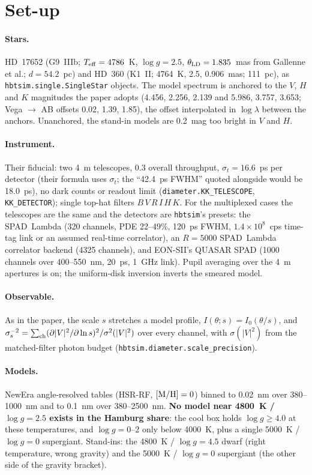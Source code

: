 \documentclass[11pt]{article}
\begin{document}
\section{Set-up}

\paragraph{Stars.} HD~17652 (G9~IIIb; $T_{\rm eff} = 4786$~K, $\log g
= 2.5$, $\theta_{\rm LD} = 1.835$~mas from Gallenne et al.; $d =
54.2$~pc) and HD~360 (K1~II; 4764~K, 2.5, 0.906~mas; 111~pc), as
\texttt{hbtsim.single.SingleStar} objects. The model spectrum is
anchored to the $V$, $H$ and $K$ magnitudes the paper adopts (4.456,
2.256, 2.139 and 5.986, 3.757, 3.653; Vega $\to$ AB offsets 0.02,
1.39, 1.85), the offset interpolated in $\log\lambda$ between the
anchors. Unanchored, the stand-in models are 0.2~mag too bright in
$V$ and $H$.

\paragraph{Instrument.} Their fiducial: two 4~m telescopes, 0.3
overall throughput, $\sigma_t = 16.6$~ps per detector (their formula
uses $\sigma_t$; the ``42.4~ps FWHM'' quoted alongside would be
18.0~ps), no dark counts or readout limit
(\texttt{diameter.KK\_TELESCOPE}, \texttt{KK\_DETECTOR}); single
top-hat filters $B\,V\,R\,I\,H\,K$. For the multiplexed cases the
telescopes are the same and the detectors are \texttt{hbtsim}'s
presets: the SPAD~Lambda (320 channels, PDE 22--49\%, 120~ps FWHM,
$1.4\times10^8$~cps time-tag link or an assumed real-time correlator), an $R =
5000$ SPAD~Lambda correlator backend (4325 channels), and EON-SII's
QUASAR SPAD (1000 channels over 400--550~nm, 20~ps, 1~GHz link).
Pupil averaging over the 4~m apertures is on; the uniform-disk
inversion inverts the smeared model.

\paragraph{Observable.} As in the paper, the scale $s$ stretches a
model profile, $I(\theta; s) = I_0(\theta/s)$, and
$\sigma_s^{-2} = \sum_{\rm ch} (\partial|V|^2/\partial \ln s)^2 /
\sigma^2(|V|^2)$ over every channel, with $\sigma(|V|^2)$ from the
matched-filter photon budget (\texttt{hbtsim.diameter.scale\_precision}).

\paragraph{Models.} NewEra angle-resolved tables (HSR-RF, $[{\rm M/H}]
= 0$) binned to 0.02~nm over 380--1000~nm and to 0.1~nm over
380--2500~nm. \textbf{No model near 4800~K / $\log g = 2.5$ exists in
the Hamburg share}: the cool box holds $\log g \ge 4.0$ at these
temperatures, and $\log g = 0$--2 only below 4000~K, plus a single
5000~K / $\log g = 0$ supergiant. Stand-ins: the 4800~K / $\log g =
4.5$ dwarf (right temperature, wrong gravity) and the 5000~K /
$\log g = 0$ supergiant (the other side of the gravity bracket).
\end{document}
